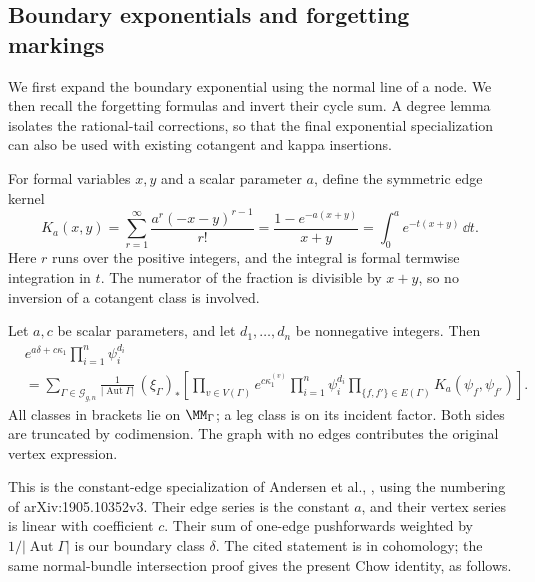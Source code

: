 \subsection{Boundary exponentials and forgetting markings}
\label{subsec:s02:04}

We first expand the boundary exponential using the normal line of a
node.  We then recall the forgetting formulas and invert their cycle
sum.  A degree lemma isolates the rational-tail corrections, so that
the final exponential specialization can also be used with existing
cotangent and kappa insertions.

For formal variables $x,y$ and a scalar parameter $a$, define the
symmetric edge kernel
\begin{equation}
\label{eq:s02:edge-kernel}
K_a(x,y)=\sum_{r=1}^{\infty}\frac{a^r(-x-y)^{r-1}}{r!}
=\frac{1-e^{-a(x+y)}}{x+y}
=\int_0^a e^{-t(x+y)}\,\dd t.
\end{equation}
Here $r$ runs over the positive integers, and the integral is formal
termwise integration in $t$.  The numerator of the fraction is
divisible by $x+y$, so no inversion of a cotangent class is involved.

\begin{prp}
\label{prp:s02:boundary-exponential}
Let $a,c$ be scalar parameters, and let $d_1,\ldots,d_n$ be
nonnegative integers.  Then
\begin{equation}
\label{eq:s02:boundary-exponential}
\begin{split}
&e^{a\delta+c\kappa_1}\prod_{i=1}^n\psi_i^{d_i}\\
&=\sum_{\Gamma\in\mathcal G_{g,n}}
\frac{1}{|\operatorname{Aut}\Gamma|}\,
(\xi_\Gamma)_*\left[
\prod_{v\in V(\Gamma)}e^{c\kappa_1^{(v)}}
\prod_{i=1}^n\psi_i^{d_i}
\prod_{\{f,f'\}\in E(\Gamma)}K_a(\psi_f,\psi_{f'})
\right].
\end{split}
\end{equation}
All classes in brackets lie on $\MM_\Gamma$; a leg class is on its
incident factor.  Both sides are truncated by codimension.  The graph
with no edges contributes the original vertex expression.
\end{prp}

This is the constant-edge specialization of Andersen et al.,
\cite[Lemma 3.10, (3.18)--(3.22)]{ABCDGLW23}, using the numbering of
arXiv:1905.10352v3.  Their edge series is the constant $a$, and their
vertex series is linear with coefficient $c$.  Their sum of one-edge
pushforwards weighted by $1/|\operatorname{Aut}\Gamma|$ is our
boundary class $\delta$.  The cited statement is in cohomology; the
same normal-bundle intersection proof gives the present Chow identity,
as follows.

